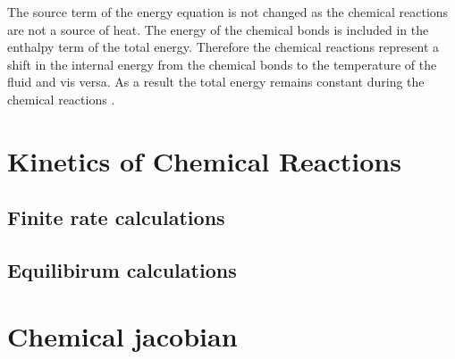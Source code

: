 The source term of the energy equation is not changed as the chemical reactions are not a source of heat. The energy of the chemical bonds is included in the enthalpy term of the total energy. Therefore the chemical reactions represent a shift in the internal energy from the chemical bonds to the temperature of the fluid and vis versa. As a result the total energy remains constant during the chemical reactions \cite{keeChemicallyReactingFlow2003}.

\section{Kinetics of Chemical Reactions}
\subsection{Finite rate calculations}
\subsection{Equilibirum calculations}

\section{Chemical jacobian}

